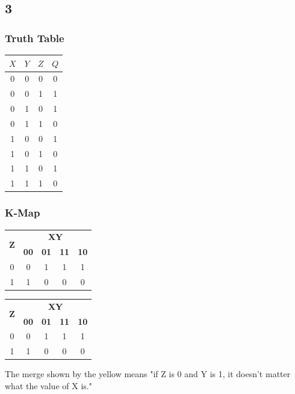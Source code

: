 \documentclass{article}
\begin{document}
    \subsection*{3}

    \subsubsection*{Truth Table}

    \begin{flushleft}
    \begin{tabular}{|c|c|c|c|}
    \hline
    $X$ & $Y$ & $Z$ & $Q$ \\
    \hline
    0 & 0 & 0 & 0\\
    0 & 0 & 1 & 1\\
    0 & 1 & 0 & 1\\
    0 & 1 & 1 & 0\\
    1 & 0 & 0 & 1\\
    1 & 0 & 1 & 0\\
    1 & 1 & 0 & 1\\
    1 & 1 & 1 & 0\\
    \hline
    \end{tabular}
    \end{flushleft}

    \subsubsection*{K-Map}
    
    \begin{table}[h]
        
        \begin{tabular}{|c|c|c|c|c|}
            \hline
            \multirow{2}{*}{\textbf{Z}} & \multicolumn{4}{c|}{\textbf{XY}} \\
            \cline{2-5}
             & \textbf{00} & \textbf{01} & \textbf{11} & \textbf{10} \\
            \hline
            0 & 0& 1& 1& 1\\
            \hline
            1 & 1& 0& 0& 0\\
            \hline
        \end{tabular}
    \end{table}

    \begin{table}[h]
        \begin{tabular}{|c|c|c|c|c|}
            \hline
            \multirow{2}{*}{\textbf{Z}} & \multicolumn{4}{c|}{\textbf{XY}} \\
            \cline{2-5}
             & \textbf{00} & \textbf{01} & \textbf{11} & \textbf{10} \\
            \hline
            0 & 0& \cellcolor{yellow!}1& \cellcolor{yellow}1& 1\\

            \hline
            1 & 1& 0& 0& 0\\
            \hline
        \end{tabular}
    \end{table}
    \noindent
    The merge shown by the yellow means "if Z is 0 and Y is 1, it doesn't matter what the value of X is."
\end{document}
